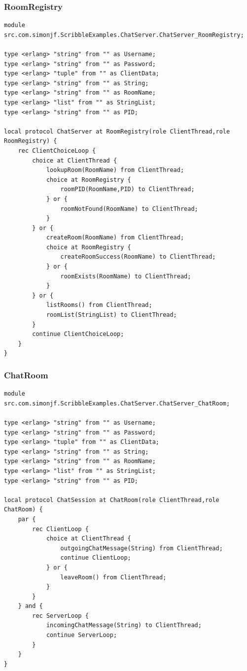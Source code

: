 \documentclass[a4paper]{article}
\begin{document}
\subsubsection{RoomRegistry}
\begin{lstlisting}[language=scribble]
module src.com.simonjf.ScribbleExamples.ChatServer.ChatServer_RoomRegistry;

type <erlang> "string" from "" as Username;
type <erlang> "string" from "" as Password;
type <erlang> "tuple" from "" as ClientData;
type <erlang> "string" from "" as String;
type <erlang> "string" from "" as RoomName;
type <erlang> "list" from "" as StringList;
type <erlang> "string" from "" as PID;

local protocol ChatServer at RoomRegistry(role ClientThread,role RoomRegistry) {
    rec ClientChoiceLoop {
        choice at ClientThread {
            lookupRoom(RoomName) from ClientThread;
            choice at RoomRegistry {
                roomPID(RoomName,PID) to ClientThread;
            } or {
                roomNotFound(RoomName) to ClientThread;
            }
        } or {
            createRoom(RoomName) from ClientThread;
            choice at RoomRegistry {
                createRoomSuccess(RoomName) to ClientThread;
            } or {
                roomExists(RoomName) to ClientThread;
            }
        } or {
            listRooms() from ClientThread;
            roomList(StringList) to ClientThread;
        }
        continue ClientChoiceLoop;
    }
}
\end{lstlisting}

\subsubsection{ChatRoom}
\begin{lstlisting}[language=scribble]
module src.com.simonjf.ScribbleExamples.ChatServer.ChatServer_ChatRoom;

type <erlang> "string" from "" as Username;
type <erlang> "string" from "" as Password;
type <erlang> "tuple" from "" as ClientData;
type <erlang> "string" from "" as String;
type <erlang> "string" from "" as RoomName;
type <erlang> "list" from "" as StringList;
type <erlang> "string" from "" as PID;

local protocol ChatSession at ChatRoom(role ClientThread,role ChatRoom) {
    par {
        rec ClientLoop {
            choice at ClientThread {
                outgoingChatMessage(String) from ClientThread;
                continue ClientLoop;
            } or {
                leaveRoom() from ClientThread;
            }
        }
    } and {
        rec ServerLoop {
            incomingChatMessage(String) to ClientThread;
            continue ServerLoop;
        }
    }
}
\end{lstlisting}
\end{document}
